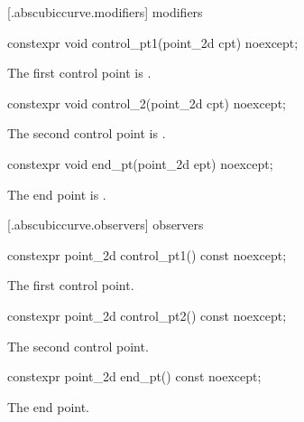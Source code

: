  [\iotwod.abscubiccurve.modifiers]{ modifiers}

%
\begin{itemdecl}
constexpr void control_pt1(point_2d cpt) noexcept;
\end{itemdecl}
\begin{itemdescr}
\pnum
\effects
The first control point is .
\end{itemdescr}

%
\begin{itemdecl}
constexpr void control_2(point_2d cpt) noexcept;
\end{itemdecl}
\begin{itemdescr}
\pnum
\effects
The second control point is .
\end{itemdescr}

%
\begin{itemdecl}
constexpr void end_pt(point_2d ept) noexcept;
\end{itemdecl}
\begin{itemdescr}
\pnum
\effects
The end point is .
\end{itemdescr}

 [\iotwod.abscubiccurve.observers]{ observers}

%
\begin{itemdecl}
constexpr point_2d control_pt1() const noexcept;
\end{itemdecl}
\begin{itemdescr}
\pnum
\returns
The first control point.
\end{itemdescr}

%
\begin{itemdecl}
constexpr point_2d control_pt2() const noexcept;
\end{itemdecl}
\begin{itemdescr}
\pnum
\returns
The second control point.
\end{itemdescr}

%
\begin{itemdecl}
constexpr point_2d end_pt() const noexcept;
\end{itemdecl}
\begin{itemdescr}
\pnum
\returns
The end point.
\end{itemdescr}

